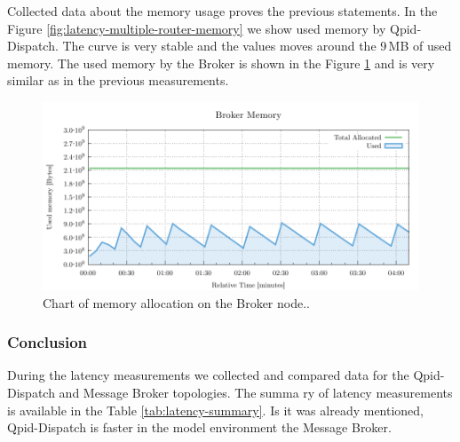 Collected data about the memory usage proves the previous statements. In the Figure \ref{fig:latency-multiple-router-memory} we show used memory by Qpid-Dispatch. The curve is very stable and the values moves around the 9\,MB of used memory. The used memory by the Broker is shown in the Figure \ref{fig:latency-multiple-broker-memory} and is very similar as in the previous measurements.

\begin{figure}[H]
	\centering
	\includegraphics[width=1\linewidth]{obrazky-figures/charts/multipoint-router-broker-latency-memory.pdf}
	\caption{Chart of memory allocation on the Broker node..}
	\label{fig:latency-multiple-broker-memory}
\end{figure}

\subsubsection*{Conclusion}
During the latency measurements we collected and compared data for the Qpid-Dispatch and Message Broker topologies. The summa
ry of latency measurements is available in the Table \ref{tab:latency-summary}. Is it was already mentioned, Qpid-Dispatch is faster in the model environment the Message Broker.

